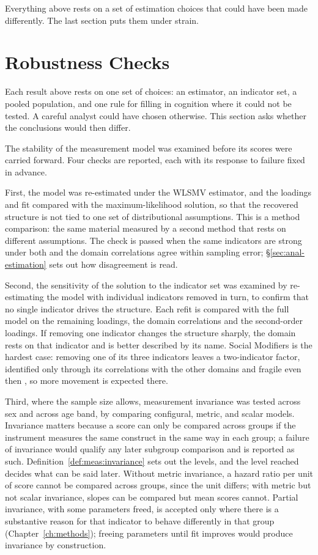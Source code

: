 Everything above rests on a set of estimation choices that could have been made
differently. The last section puts them under strain.

\section{Robustness Checks}
\label{sec:anal-robust}
\label{sec:anal-checks}
Each result above rests on one set of choices: an estimator, an indicator set, a pooled population, and one rule for filling in cognition where it could not be tested. A careful analyst could have chosen otherwise. This section asks whether the conclusions would then differ.

The stability of the measurement model was examined before its scores were carried forward. Four checks are reported, each with its response to failure fixed in advance.

First, the model was re-estimated under the WLSMV estimator, and the loadings and fit compared with the maximum-likelihood solution, so that the recovered structure is not tied to one set of distributional assumptions. This is a method comparison: the same material measured by a second method that rests on different assumptions. The check is passed when the same indicators are strong under both and the domain correlations agree within sampling error; \S\ref{sec:anal-estimation} sets out how disagreement is read.

Second, the sensitivity of the solution to the indicator set was examined by re-estimating the model with individual indicators removed in turn, to confirm that no single indicator drives the structure. Each refit is compared with the full model on the remaining loadings, the domain correlations and the second-order loadings. If removing one indicator changes the structure sharply, the domain rests on that indicator and is better described by its name. Social Modifiers is the hardest case: removing one of its three indicators leaves a two-indicator factor, identified only through its correlations with the other domains and fragile even then \citep{bollen_1989,kline_2015}, so more movement is expected there.

Third, where the sample size allows, measurement invariance \citep{meredith_1993,vandenberg_lance_2000} was tested across sex and across age band, by comparing configural, metric, and scalar models. Invariance matters because a score can only be compared across groups if the instrument measures the same construct in the same way in each group; a failure of invariance would qualify any later subgroup comparison and is reported as such. Definition~\ref{def:meas:invariance} sets out the levels, and the level reached decides what can be said later. Without metric invariance, a hazard ratio per unit of score cannot be compared across groups, since the unit differs; with metric but not scalar invariance, slopes can be compared but mean scores cannot. Partial invariance, with some parameters freed, is accepted only where there is a substantive reason for that indicator to behave differently in that group (Chapter~\ref{ch:methods}); freeing parameters until fit improves would produce invariance by construction.

